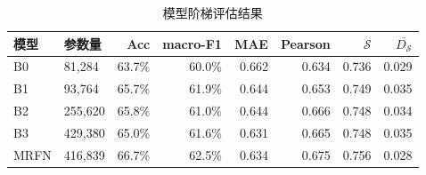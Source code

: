 \begin{table}[htbp]
  \centering
  \caption{模型阶梯评估结果}
  \label{tab:p2-ladder}
  \begin{tabularx}{\textwidth}{@{}lXrrrrrr@{}}
    \toprule
    模型 & 参数量 & Acc & macro-F1 & MAE & Pearson & $\mathcal{S}$ & $\overline{D_{\mathcal{S}}}$ \\
    \midrule
    B0 & 81,284 & 63.7\% & 60.0\% & 0.662 & 0.634 & 0.736 & 0.029 \\
    B1 & 93,764 & 65.7\% & 61.9\% & 0.644 & 0.653 & 0.749 & 0.035 \\
    B2 & 255,620 & 65.8\% & 61.0\% & 0.644 & 0.666 & 0.748 & 0.034 \\
    B3 & 429,380 & 65.0\% & 61.6\% & 0.631 & 0.665 & 0.748 & 0.035 \\
    MRFN & 416,839 & 66.7\% & 62.5\% & 0.634 & 0.675 & 0.756 & 0.028 \\
    \bottomrule
  \end{tabularx}
  \par \smallskip
  \end{table}
